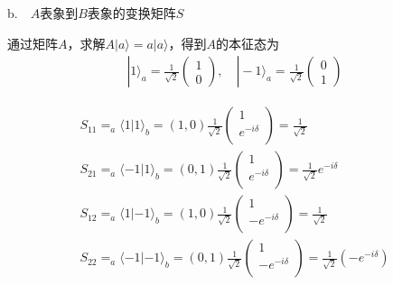 b.\ \  $A$表象到$B$表象的变换矩阵$S$

通过矩阵$A$，求解$A|a \rangle=a|a \rangle$，得到$A$的本征态为
$$
\begin{array}{l}
|1\rangle_{a}=\frac{1}{\sqrt{2}}\left(\begin{array}{l}
1 \\
0
\end{array}\right), \quad|-1\rangle_{a}=\frac{1}{\sqrt{2}}\left(\begin{array}{l}
0 \\
1
\end{array}\right)
\end{array}
$$

$$
\begin{array}{l}
	\left. S_{11}=_a\langle 1|1\rangle _b=(1,0)\frac{1}{\sqrt{2}}\left( \begin{array}{c}
	1\\
	e^{-i\delta}\\
\end{array} \right) =\frac{1}{\sqrt{2}} \right.\\
	S_{21}=_a\langle -1|1\rangle _b=(0,1)\frac{1}{\sqrt{2}}\left( \begin{array}{c}
	1\\
	e^{-i\delta}\\
\end{array} \right) =\frac{1}{\sqrt{2}}e^{-i\delta}\\
	S_{12}=_a\langle 1|-1\rangle _b=(1,0)\frac{1}{\sqrt{2}}\left( \begin{array}{c}
	1\\
	-e^{-i\delta}\\
\end{array} \right) =\frac{1}{\sqrt{2}}\\
	S_{22}=_a\langle -1|-1\rangle _b=(0,1)\frac{1}{\sqrt{2}}\left( \begin{array}{c}
	1\\
	-e^{-i\delta}\\
\end{array} \right) =\frac{1}{\sqrt{2}}\left( -e^{-i\delta} \right)\\
\end{array}
$$
